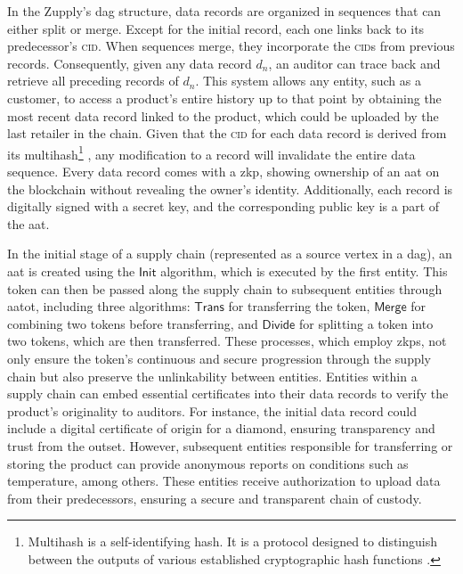 In the Zupply's \gls{dag} structure, data records are organized in sequences that can either split or merge. Except for the initial record, each one links back to its predecessor's \textsc{cid}. When sequences merge, they incorporate the \textsc{cid}s from previous records. Consequently, given any data record $d_n$, an auditor can trace back and retrieve all preceding records of $d_n$. This system allows any entity, such as a customer, to access a product's entire history up to that point by obtaining the most recent data record linked to the product, which could be uploaded by the last retailer in the chain. Given that the \textsc{cid} for each data record is derived from its multihash\footnote{Multihash is a self-identifying hash. It is a protocol designed to distinguish between the outputs of various established cryptographic hash functions \cite{multihash}.} \cite{Benet2014}, any modification to a record will invalidate the entire data sequence. 
Every data record comes with a \gls{zkp}, showing ownership of an \gls{aat} on the blockchain without revealing the owner's identity. Additionally, each record is digitally signed with a secret key, and the corresponding public key is a part of the \gls{aat}. 

In the initial stage of a supply chain (represented as a source vertex in a \gls{dag}), an \gls{aat} is created using the $\textsf{Init}$ algorithm, which is executed by the first entity. This token can then be passed along the supply chain to subsequent entities through \gls{aatot}, including three algorithms: $\textsf{Trans}$ for transferring the token, $\textsf{Merge}$ for combining two tokens before transferring, and $\textsf{Divide}$ for splitting a token into two tokens, which are then transferred. These processes, which employ \gls{zkp}s, not only ensure the token's continuous and secure progression through the supply chain but also preserve the unlinkability between entities. Entities within a supply chain can embed essential certificates into their data records to verify the product's originality to auditors. For instance, the initial data record could include a digital certificate of origin for a diamond, ensuring transparency and trust from the outset. However, subsequent entities responsible for transferring or storing the product can provide anonymous reports on conditions such as temperature, among others. These entities receive authorization to upload data from their predecessors, ensuring a secure and transparent chain of custody.

